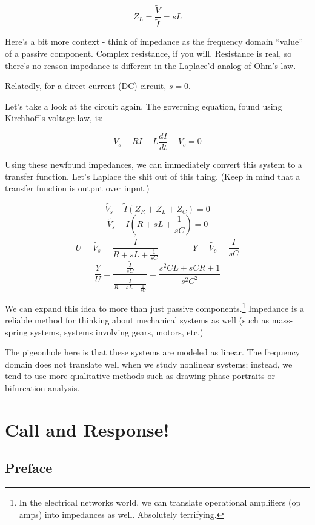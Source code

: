 \documentclass{report}
\begin{document}
\begin{onehalfspacing}
\begin{flushleft}
\vspace{-0.1in}
\[Z_L = \frac{\tilde{V}}{\tilde{I}} = sL\]

Here's a bit more context - think of impedance as the frequency domain ``value'' of a passive component. Complex resistance, if you will. Resistance is real, so there's no reason impedance is different in the Laplace'd analog of Ohm's law.

\medskip

Relatedly, for a direct current (DC) circuit, \(s=0\).

\medskip

Let's take a look at the circuit again. The governing equation, found using Kirchhoff's voltage law, is:

\vspace{-0.1in}
\[V_s - RI - L \frac{dI}{dt} - V_c = 0\]

Using these newfound impedances, we can immediately convert this system to a transfer function. Let's Laplace the shit out of this thing. (Keep in mind that a transfer function is output over input.)

\vspace{-0.1in}
\[\tilde{V_s} - \tilde{I} (Z_R + Z_L + Z_C) = 0\]
\[\tilde{V_s} - \tilde{I} (R + sL + \frac{1}{sC}) = 0\]
\[U = \tilde{V_s} = \frac{\tilde{I}}{R + sL + \frac{1}{sC}}\qquad \qquad Y = \tilde{V_c} = \frac{\tilde{I}}{sC}\]
\[\frac{Y}{U} = \frac{\frac{\tilde{I}}{sC}}{\frac{\tilde{I}}{R + sL + \frac{1}{sC}}} = \frac{s^2 CL + sCR + 1}{s^2 C^2}\]

We can expand this idea to more than just passive components.\footnote{In the electrical networks world, we can translate operational amplifiers (op amps) into impedances as well. Absolutely terrifying.} Impedance is a reliable method for thinking about mechanical systems as well (such as mass-spring systems, systems involving gears, motors, etc.)

\medskip

The pigeonhole here is that these systems are modeled as linear. The frequency domain does not translate well when we study nonlinear systems; instead, we tend to use more qualitative methods such as drawing phase portraits or bifurcation analysis.


\chapter{Call and Response!}

\section*{Preface}


\end{flushleft}
\end{onehalfspacing}
\end{document}
